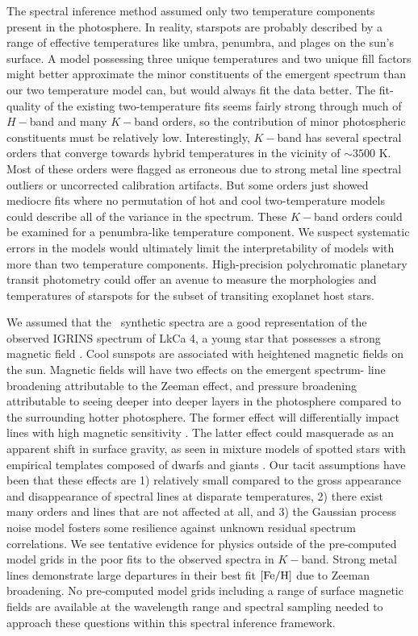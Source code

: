 \documentclass[twocolumn]{emulateapj}%
\begin{document}
The spectral inference method assumed only two temperature components present in the photosphere.  In reality, starspots are probably described by a range of effective temperatures like umbra, penumbra, and plages on the sun's surface.  A model possessing three unique temperatures and two unique fill factors might better approximate the minor constituents of the emergent spectrum than our two temperature model can, but would always fit the data better.  The fit-quality of the existing two-temperature fits seems fairly strong through much of $H-$band and many $K-$band orders, so the contribution of minor photospheric constituents must be relatively low.  Interestingly, $K-$band has several spectral orders that converge towards hybrid temperatures in the vicinity of $\sim3500$ K.  Most of these orders were flagged as erroneous due to strong metal line spectral outliers or uncorrected calibration artifacts.  But some orders just showed mediocre fits where no permutation of hot and cool two-temperature models could describe all of the variance in the spectrum.  These $K-$band orders could be examined for a penumbra-like temperature component.  We suspect systematic errors in the models would ultimately limit the interpretability of models with more than two temperature components.  High-precision polychromatic planetary transit photometry could offer an avenue to measure the morphologies and temperatures of starspots for the subset of transiting exoplanet host stars.  

We assumed that the \PHOENIX\ synthetic spectra are a good representation of the observed IGRINS spectrum of LkCa 4, a young star that possesses a strong magnetic field \citep{donati14}.  Cool sunspots are associated with heightened magnetic fields on the sun.  Magnetic fields will have two effects on the emergent spectrum- line broadening attributable to the Zeeman effect, and pressure broadening attributable to seeing deeper into deeper layers in the photosphere compared to the surrounding hotter photosphere.  The former effect will differentially impact lines with high magnetic sensitivity \citep{2013AJ....146...51D}.  The latter effect could masquerade as an apparent shift in surface gravity, as seen in mixture models of spotted stars with empirical templates composed of dwarfs and giants \citep{oneal96}.  Our tacit assumptions have been that these effects are 1) relatively small compared to the gross appearance and disappearance of spectral lines at disparate temperatures, 2) there exist many orders and lines that are not affected at all, and 3) the Gaussian process noise model fosters some resilience against unknown residual spectrum correlations.  We see tentative evidence for physics outside of the pre-computed model grids in the poor fits to the observed spectra in $K-$band.  Strong metal lines demonstrate large departures in their best fit $[{\rm Fe}/{\rm H}]$ due to Zeeman broadening.  No pre-computed model grids including a range of surface magnetic fields are available at the wavelength range and spectral sampling needed to approach these questions within this spectral inference framework.
\end{document}
